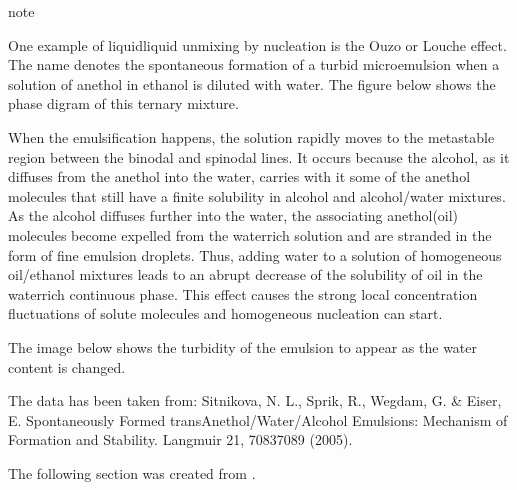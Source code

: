 \documentclass[letterpaper,10pt,english]{sphinxmanual}
\let\sphinxpxdimen\pdfpxdimen\else\newdimen\sphinxpxdimen
\begin{document}
\begin{sphinxadmonition}{note}{}\unskip
\sphinxAtStartPar
{}

\sphinxAtStartPar
One example of liquid\sphinxhyphen{}liquid unmixing by nucleation is the Ouzo or Louche effect. The name denotes the spontaneous formation of a turbid microemulsion when a solution of anethol in ethanol is diluted with water. The figure below shows the phase digram of this ternary mixture.

\noindent\sphinxincludegraphics[width=591\sphinxpxdimen,height=414\sphinxpxdimen]{{ouzo}.png}

\sphinxAtStartPar
When the emulsification happens, the solution rapidly moves to the metastable region between the binodal and spinodal lines. It occurs because the alcohol, as it diffuses from the anethol into the water, carries with it some of the anethol molecules that still have a finite solubility in alcohol and alcohol/water mixtures. As the alcohol diffuses further into the water, the associating anethol(oil) molecules become expelled from the water\sphinxhyphen{}rich solution and are stranded in the form of fine
emulsion droplets. Thus, adding water to a solution of homogeneous oil/ethanol mixtures leads to an abrupt decrease of the solubility of oil in the water\sphinxhyphen{}rich continuous phase. This effect causes the strong local concentration fluctuations of solute molecules and homogeneous nucleation can start.

\sphinxAtStartPar
The image below shows the turbidity of the emulsion to appear as the water content is changed.

\noindent\sphinxincludegraphics[width=514\sphinxpxdimen,height=161\sphinxpxdimen]{{ouzo_1}.png}

\sphinxAtStartPar
The data has been taken from: Sitnikova, N. L., Sprik, R., Wegdam, G. \& Eiser, E. Spontaneously Formed trans\sphinxhyphen{}Anethol/Water/Alcohol Emulsions: Mechanism of Formation and Stability. Langmuir 21, 7083\textendash{}7089 (2005).
\end{sphinxadmonition}



\sphinxAtStartPar
The following section was created from .
\end{document}
